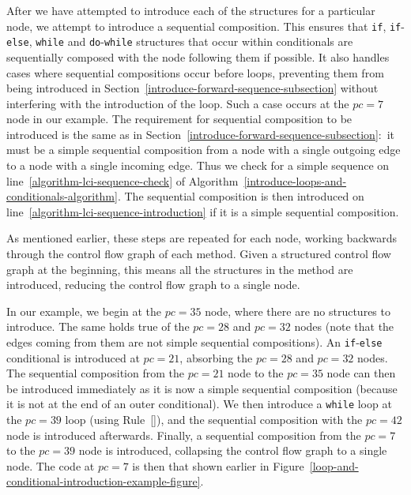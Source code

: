 After we have attempted to introduce each of the structures for a
particular node, we attempt to introduce a sequential composition.
This ensures that \texttt{if}, \texttt{if}-\texttt{else},
\texttt{while} and \texttt{do}-\texttt{while} structures that occur
within conditionals are sequentially composed with the node following
them if possible.
It also handles cases where sequential compositions occur before
loops, preventing them from being introduced in
Section~\ref{introduce-forward-sequence-subsection} without
interfering with the introduction of the loop.
Such a case occurs at the $pc=7$ node in our example.
The requirement for sequential composition to be introduced is the
same as in Section~\ref{introduce-forward-sequence-subsection}:~it
must be a simple sequential composition from a node with a single
outgoing edge to a node with a single incoming edge.
Thus we check for a simple sequence on
line~\ref{algorithm-lci-sequence-check} of
Algorithm~\ref{introduce-loops-and-conditionals-algorithm}.
The sequential composition is then introduced on
line~\ref{algorithm-lci-sequence-introduction} if it is a simple
sequential composition.

As mentioned earlier, these steps are repeated for each node, working
backwards through the control flow graph of each method.
Given a structured control flow graph at the beginning, this means all
the structures in the method are introduced, reducing the control flow
graph to a single node.

In our example, we begin at the $pc=35$ node, where there are no
structures to introduce. 
The same holds true of the $pc=28$ and $pc=32$ nodes (note that the
edges coming from them are not simple sequential compositions).
An \texttt{if}-\texttt{else} conditional is introduced at $pc=21$,
absorbing the $pc=28$ and $pc=32$ nodes.
The sequential composition from the $pc=21$ node to the $pc=35$ node
can then be introduced immediately as it is now a simple sequential
composition (because it is not at the end of an outer conditional).
We then introduce a \texttt{while} loop at the $pc=39$ loop (using
Rule~[]), and the sequential
composition with the $pc=42$ node is introduced afterwards.
Finally, a sequential composition from the $pc=7$ to the $pc=39$ node
is introduced, collapsing the control flow graph to a single node.
The code at $pc=7$ is then that shown earlier in
Figure~\ref{loop-and-conditional-introduction-example-figure}.
